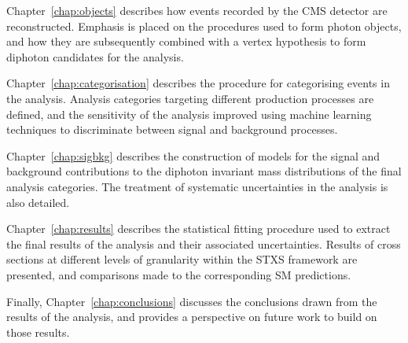 Chapter~\ref{chap:objects} describes how events recorded by the CMS detector are reconstructed.
Emphasis is placed on the procedures used to form photon objects, 
and how they are subsequently combined with a vertex hypothesis to form diphoton candidates 
for the \Hgg analysis.

Chapter~\ref{chap:categorisation} describes the procedure for categorising events in the \Hgg analysis.
Analysis categories targeting different production processes are defined, 
and the sensitivity of the analysis improved 
using machine learning techniques to discriminate between signal and background processes.

Chapter~\ref{chap:sigbkg} describes the construction of models for the signal and background 
contributions to the diphoton invariant mass distributions of the final analysis categories.
The treatment of systematic uncertainties in the analysis is also detailed.

Chapter~\ref{chap:results} describes the statistical fitting procedure used 
to extract the final results of the analysis and their associated uncertainties.
Results of cross sections at different levels of granularity within the STXS framework 
are presented, and comparisons made to the corresponding SM predictions.

Finally, Chapter~\ref{chap:conclusions} discusses the conclusions drawn from the results of the analysis, 
and provides a perspective on future work to build on those results.
